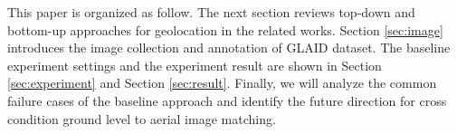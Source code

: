 
This paper is organized as follow.  The next section reviews top-down and bottom-up approaches for geolocation in the related works.  Section \ref{sec:image} introduces the image collection and annotation of GLAID dataset.  The baseline experiment settings and the experiment result are shown in Section \ref{sec:experiment} and Section \ref{sec:result}.  Finally, we will analyze the common failure cases of the baseline approach and identify the future direction for cross condition ground level to aerial image matching.  




